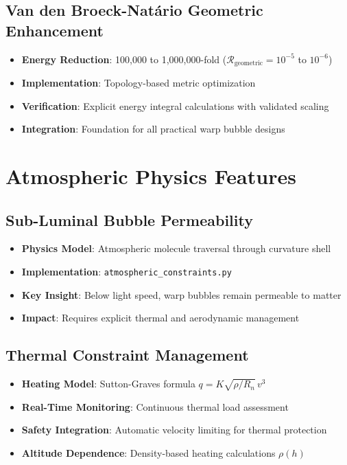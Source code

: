 \documentclass[11pt]{article}
\begin{document}
\subsection{Van den Broeck-Natário Geometric Enhancement}
\begin{itemize}
\item \textbf{Energy Reduction}: 100,000 to 1,000,000-fold ($\mathcal{R}_{\text{geometric}} = 10^{-5}$ to $10^{-6}$)
\item \textbf{Implementation}: Topology-based metric optimization
\item \textbf{Verification}: Explicit energy integral calculations with validated scaling
\item \textbf{Integration}: Foundation for all practical warp bubble designs
\end{itemize}

\section{Atmospheric Physics Features}

\subsection{Sub-Luminal Bubble Permeability}
\begin{itemize}
\item \textbf{Physics Model}: Atmospheric molecule traversal through curvature shell
\item \textbf{Implementation}: \texttt{atmospheric\_constraints.py}
\item \textbf{Key Insight}: Below light speed, warp bubbles remain permeable to matter
\item \textbf{Impact}: Requires explicit thermal and aerodynamic management
\end{itemize}

\subsection{Thermal Constraint Management}
\begin{itemize}
\item \textbf{Heating Model}: Sutton-Graves formula $q = K\sqrt{\rho/R_n}\,v^3$
\item \textbf{Real-Time Monitoring}: Continuous thermal load assessment
\item \textbf{Safety Integration}: Automatic velocity limiting for thermal protection
\item \textbf{Altitude Dependence}: Density-based heating calculations $\rho(h)$
\end{itemize}
\end{document}

